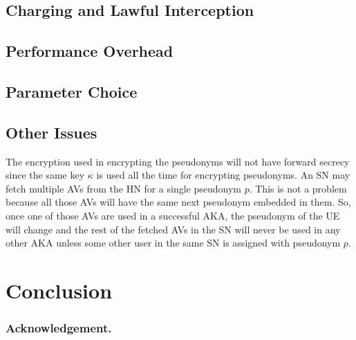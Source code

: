\documentclass{llncs} %
\begin{document}
\subsection{Charging and Lawful Interception}

\subsection{Performance Overhead}

\subsection{Parameter Choice}

\subsection{Other Issues}
The encryption used in encrypting the pseudonyms will not have forward secrecy since the same key $\kappa$ is used all the time for encrypting pseudonyms. An SN may fetch multiple AVs from the HN for a single pseudonym $p$. This is not a problem because all those AVs will have the same next pseudonym embedded in them. So, once one of those AVs are used in a successful AKA, the pseudonym of the UE will change and the rest of the fetched AVs in the SN will never be used in any other AKA unless some other user in the same SN is assigned with pseudonym $p$. 

\section{Conclusion}
\label{sec:conclusion}


\subsubsection{Acknowledgement.}
\label{sec:acknowledgement}



{}

\begin{thebibliography}{5}



\end{thebibliography}
\end{document}
